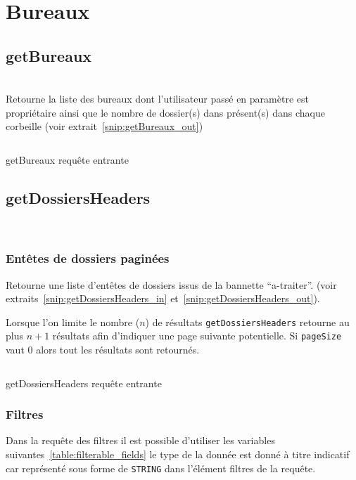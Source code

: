 \section{Bureaux}

\subsection{getBureaux}
\\

Retourne la liste des bureaux dont l'utilisateur passé en paramètre est propriétaire ainsi que le nombre de dossier(s) dans présent(s) dans chaque corbeille (voir extrait~\ref{snip:getBureaux_out}) 

\begin{codesnippet}
\inputminted[frame=single,linenos,fontsize=\footnotesize]{javascript}{extraits/getBureaux_in.js}
\caption{getBureaux requête entrante}
\label{snip:getBureaux_in}
\end{codesnippet}

\subsection{getDossiersHeaders}
\\

\subsubsection{Entêtes de dossiers paginées}

Retourne une liste d'entêtes de dossiers issus de la bannette ``a-traiter''. (voir extraits~\ref{snip:getDossiersHeaders_in} et~\ref{snip:getDossiersHeaders_out}).

Lorsque l'on limite le nombre ($n$) de résultats \verb|getDossiersHeaders| retourne au plus $n + 1$ résultats afin d'indiquer une page suivante potentielle. Si \verb|pageSize| vaut 0 alors tout les résultats sont retournés.

\begin{codesnippet}
\inputminted[frame=single,linenos,fontsize=\footnotesize]{javascript}{extraits/getDossiersHeaders_in.js}
\caption{getDossiersHeaders requête entrante}
\label{snip:getDossiersHeaders_in}
\end{codesnippet}

\subsubsection{Filtres}
\label{Filtres}
Dans la requête des filtres il est possible d'utiliser les variables suivantes~\ref{table:filterable_fields} le type de la donnée est donné à titre indicatif car représenté sous forme de \verb|STRING| dans l'élément filtres de la requête.


